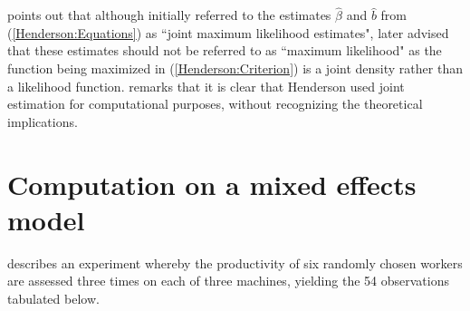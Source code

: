 \documentclass[12pt, a4paper]{report}
\theoremstyle{plain}
\theoremstyle{definition}
\theoremstyle{remark}
\begin{document}
\cite{Robi:BLUP:1991} points out that although \cite{Henderson:1950} initially referred to the estimates $\hat{\beta}$ and $\hat{b}$ from (\ref{Henderson:Equations}) as ``joint maximum likelihood estimates", \cite{Henderson:1973} later advised that these estimates should not be referred to as ``maximum likelihood" as the function being maximized in (\ref{Henderson:Criterion}) is a joint density rather than a likelihood function. \cite{Lee:Neld:Pawi:2006} remarks that it is clear that Henderson used joint estimation for computational purposes, without recognizing the theoretical implications.


\newpage
\section{Computation on a mixed effects model}

\citet{pb} describes an experiment whereby the productivity of six
randomly chosen workers are assessed three times on each of three
machines, yielding the 54 observations tabulated below.
\end{document}
